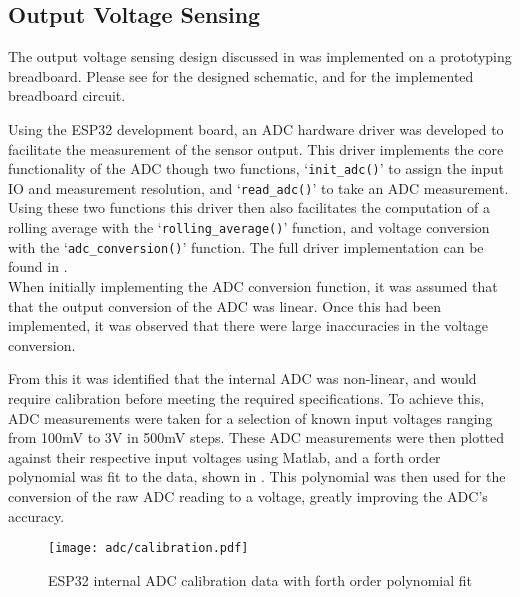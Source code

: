 
\subsection{Output Voltage Sensing}\label{S:v_sense_impl}

The output voltage sensing design discussed in  was implemented on a prototyping breadboard. Please see  for the designed schematic, and  for the implemented breadboard circuit.

Using the ESP32 development board, an ADC hardware driver was developed to facilitate the measurement of the sensor output. This driver implements the core functionality of the ADC though two functions, `\lstinline{init_adc()}' to assign the input IO and measurement resolution, and `\lstinline{read_adc()}' to take an ADC measurement. Using these two functions this driver then also facilitates the computation of a rolling average with the `\lstinline{rolling_average()}' function, and voltage conversion with the `\lstinline{adc_conversion()}' function. The full driver implementation can be found in .\\

When initially implementing the ADC conversion function, it was assumed that that the output conversion of the ADC was linear. Once this had been implemented, it was observed that there were large inaccuracies in the voltage conversion. 

From this it was identified that the internal ADC  was non-linear, and would require calibration before meeting the required specifications. To achieve this, ADC measurements were taken for a selection of known input voltages ranging from 100mV to 3V in 500mV steps. These ADC measurements were then plotted against their respective input voltages using Matlab, and a forth order polynomial was fit to the data, shown in . This polynomial was then used for the conversion of the raw ADC reading to a voltage, greatly improving the ADC's accuracy.

\begin{figure}[!h]
    \centering
    \texttt{[image: adc/calibration.pdf]}
    \caption{ESP32 internal ADC calibration data with forth order polynomial fit}
    \label{F:adc_calibration}
\end{figure}

